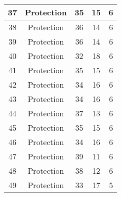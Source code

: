\documentclass[results.tex]{subfiles}
\begin{document}
\begin{center}
\begin{tabular}{| c || c | c | c | c |}
            \hline
            37                      & Protection                   & 35                     & 15                      & 6                    \\
            \hline
            38                      & Protection                   & 36                     & 14                      & 6                    \\
            \hline
            39                      & Protection                   & 36                     & 14                      & 6                    \\
            \hline
            40                      & Protection                   & 32                     & 18                      & 6                    \\
            \hline
            41                      & Protection                   & 35                     & 15                      & 6                    \\
            \hline
            42                      & Protection                   & 34                     & 16                      & 6                    \\
            \hline
            43                      & Protection                   & 34                     & 16                      & 6                    \\
            \hline
            44                      & Protection                   & 37                     & 13                      & 6                    \\
            \hline
            45                      & Protection                   & 35                     & 15                      & 6                    \\
            \hline
            46                      & Protection                   & 34                     & 16                      & 6                    \\
            \hline
            47                      & Protection                   & 39                     & 11                      & 6                    \\
            \hline
            48                      & Protection                   & 38                     & 12                      & 6                    \\
            \hline
            49                      & Protection                   & 33                     & 17                      & 5                    \\
            \hline
        \end{tabular}
    \end{center}
\end{document}
